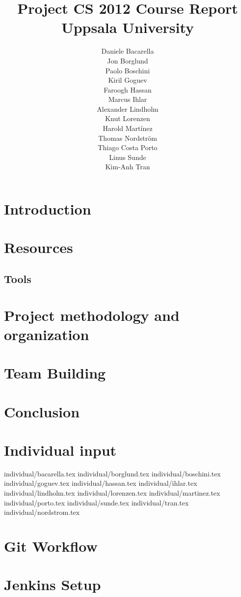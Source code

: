 \documentclass[11pt]{report}
\title{Project CS 2012 Course Report\\Uppsala University\\}
\author{Daniele Bacarella\\
		Jon Borglund\\
		Paolo Boschini\\
		Kiril Goguev\\
		Faroogh Hassan\\
		Marcus Ihlar\\
		Alexander Lindholm\\
		Knut Lorenzen\\
		Harold Mart\'{i}nez\\
		Thomas Nordstr\"om\\
		Thiago Costa Porto\\
		Linus Sunde\\
		Kim-Anh Tran
}
\date{}
\begin{document}
\maketitle

\tableofcontents

\begin{abstract}
 
\end{abstract}

\chapter{Introduction}

\chapter{Resources}





\section{Tools}
\label{sec:tools}




\chapter{Project methodology and organization}




\chapter{Team Building}

\chapter{Conclusion}


\appendix
\chapter{Individual input}

 {individual/bacarella.tex}
 {individual/borglund.tex}
 {individual/boschini.tex}
 {individual/goguev.tex}
 {individual/hassan.tex}
 {individual/ihlar.tex}
 {individual/lindholm.tex}
 {individual/lorenzen.tex}
 {individual/martinez.tex}
 {individual/porto.tex}
 {individual/sunde.tex}
 {individual/tran.tex}
 {individual/nordstrom.tex}

\chapter{Git Workflow}

\chapter{Jenkins Setup}





\end{document}
